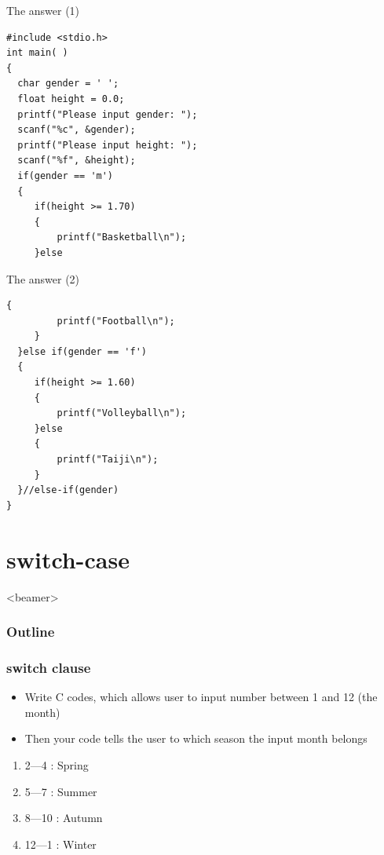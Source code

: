 \ifx\answer\undefined
\begin{frame}[fragile]{The answer (1)}
\begin{lstlisting}[xleftmargin=0.05\linewidth]
#include <stdio.h>
int main( )
{
  char gender = ' ';
  float height = 0.0;
  printf("Please input gender: ");
  scanf("%c", &gender);
  printf("Please input height: ");
  scanf("%f", &height);
  if(gender == 'm')
  {
     if(height >= 1.70)
     {
         printf("Basketball\n");
     }else
\end{lstlisting}
\end{frame}
\fi

\ifx\answer\undefined
\begin{frame}[fragile]{The answer (2)}
\begin{lstlisting}[xleftmargin=0.05\linewidth, firstnumber=16]
     {
         printf("Football\n");
     }
  }else if(gender == 'f')
  {
     if(height >= 1.60)
     {
         printf("Volleyball\n");
     }else
     {
         printf("Taiji\n");
     }
  }//else-if(gender)
}

\end{lstlisting}
\end{frame}
\fi

\section{switch-case}
\label{sec:if}
\begin{frame}<beamer>
    \frametitle{Outline}
    \tableofcontents[currentsection]
\end{frame}

\begin{frame}
\frametitle{switch clause}
\begin{itemize}
	\item {Write C codes, which allows user to input number between 1 and 12 (the month)}
	\item {Then your code tells the user to which season the input month belongs}
\end{itemize}
\begin{center}
\begin{enumerate}
	\item {2---4 : Spring}
	\item {5---7 : Summer}
	\item {8---10 : Autumn}
	\item {12---1 : Winter}
\end{enumerate}
\end{center}
\end{frame}

